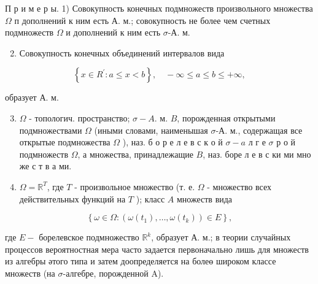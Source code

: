 \documentclass[10pt]{article}
\begin{document}
П р и м е р ы. 1) Совокупность конечных подмножеств произвольного множества $\Omega$ п дополнений к ним есть А. м.; совокупность не более чем счетных подмножеств $\Omega$ и дополнений к ним есть $\sigma$-А. м.



\begin{enumerate}

  \setcounter{enumi}{1}

  \item Совокупность конечных объединений интервалов вида

\end{enumerate}



\[

\left\{x \in R^{\prime}: a \leqslant x<b\right\}, \quad-\infty \leqslant a \leqslant b \leqslant+\infty,

\]



образует А. м.



\begin{enumerate}

  \setcounter{enumi}{2}

  \item $\Omega$ - топологич. пространство; $\sigma-A$. м. $B$, порожденная открытыми подмножествами $\Omega$ (иными словами, наименышая $\sigma$-А. м., содержащая все открытые подмножества $\Omega$ ), наз. б о р е л е в с к о й $\sigma-a$ л $г$ е $\sigma$ р о й подмножеств $\Omega$, а множества, принадлежащие $B$, наз. боре л е в с ки ми мно же с т в а ми.



  \item $\Omega=\mathbb{R}^{T}$, где $T$ - произвольное множество (т. е. $\Omega$ - множество всех действительных функций на $T$ ); класс $A$ множеств вида



\end{enumerate}



\[

\left\{\omega \in \Omega:\left(\omega\left(t_{1}\right), \ldots, \omega\left(t_{k}\right)\right) \in E\right\},

\]



где $E-$ борелевское подмножество $\mathbb{R}^{k}$, образует А. м.; в теории случайных процессов вероятностная мера часто задается первоначально лишь для множеств из алгебры әтого типа и затем доопределяется на болеө широком классе множеств (на $\sigma$-алгебре, порожденной A).
\end{document}

